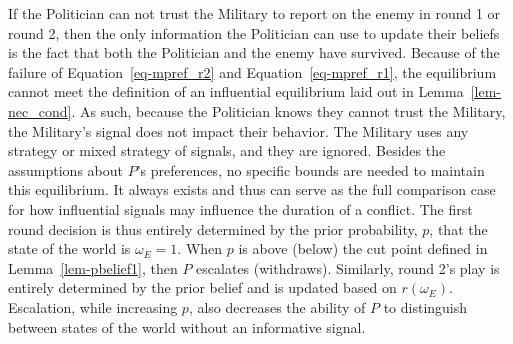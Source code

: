 \documentclass[
  12pt,
]{article}
\theoremstyle{plain}
\theoremstyle{plain}
\theoremstyle{remark}
\begin{document}
If the Politician can not trust the Military to report on the enemy in
round 1 or round 2, then the only information the Politician can use to
update their beliefs is the fact that both the Politician and the enemy
have survived. Because of the failure of Equation~\ref{eq-mpref_r2} and
Equation~\ref{eq-mpref_r1}, the equilibrium cannot meet the definition
of an influential equilibrium laid out in Lemma~\ref{lem-nec_cond}. As
such, because the Politician knows they cannot trust the Military, the
Military's signal does not impact their behavior. The Military uses any
strategy or mixed strategy of signals, and they are ignored. Besides the
assumptions about \(P\)'s preferences, no specific bounds are needed to
maintain this equilibrium. It always exists and thus can serve as the
full comparison case for how influential signals may influence the
duration of a conflict. The first round decision is thus entirely
determined by the prior probability, \(p\), that the state of the world
is \(\omega_E = 1\). When \(p\) is above (below) the cut point defined
in Lemma~\ref{lem-pbelief1}, then \(P\) escalates (withdraws).
Similarly, round 2's play is entirely determined by the prior belief and
is updated based on \(r(\omega_E)\). Escalation, while increasing \(p\),
also decreases the ability of \(P\) to distinguish between states of the
world without an informative signal.
\end{document}
